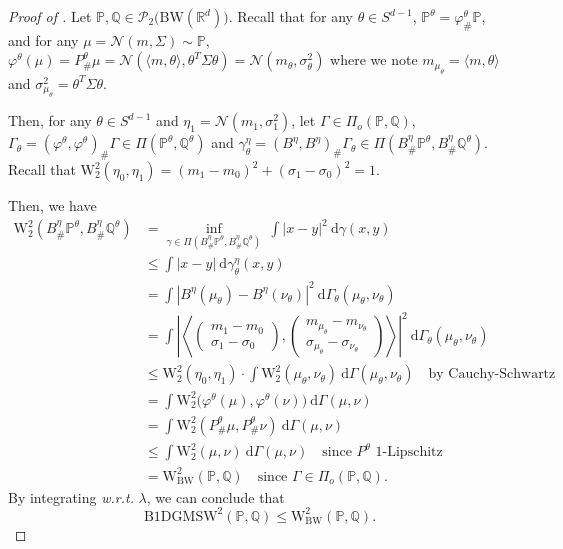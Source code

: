\documentclass[twoside]{article}
\newcommand{\cP}{\mathcal{P}}
\newcommand{\bP}{\mathbb{P}}
\newcommand{\bQ}{\mathbb{Q}}
\newcommand{\cN}{\mathcal{N}}
\newcommand{\W}{\mathrm{W}}
\newcommand{\R}{\mathbb{R}}
\newcommand{\bw}{\mathrm{BW}}
\newcommand{\smwbdg}{\mathrm{B1DGMSW}}
\begin{document}
\begin{proof}[Proof of ]
    Let $\bP, \bQ\in\cP_2\big(\bw(\R^d)\big)$. Recall that for any $\theta\in S^{d-1}$, $\bP^\theta=\varphi^\theta_\#\bP$, and for any $\mu=\cN(m,\Sigma)\sim \bP$, $\varphi^\theta(\mu)=P^\theta_\#\mu=\cN(\langle m,\theta\rangle, \theta^T\Sigma\theta) = \cN(m_\theta,\sigma_\theta^2)$ where we note $m_{\mu_\theta} = \langle m,\theta\rangle$ and $\sigma_{\mu_\theta}^2 = \theta^T\Sigma\theta$.
    
    Then, for any $\theta\in S^{d-1}$ and $\eta_1=\cN(m_1,\sigma_1^2)$, let $\Gamma\in\Pi_o(\bP,\bQ)$, $\Gamma_\theta=(\varphi^\theta, \varphi^\theta)_\#\Gamma \in \Pi(\bP^\theta,\bQ^\theta)$ and $\gamma_\theta^\eta = (B^\eta,B^\eta)_\#\Gamma_\theta\in \Pi(B^\eta_\#\bP^\theta, B^\eta_\#\bQ^\theta)$. Recall that $\W_2^2(\eta_0,\eta_1)=(m_1-m_0)^2 + (\sigma_1-\sigma_0)^2 = 1$.
    
    Then, we have
    \begin{equation}
        \begin{aligned}
            \W_2^2(B^{\eta}_\#\bP^\theta, B^\eta_\#\bQ^\theta) &= \inf_{\gamma\in\Pi(B^\eta_\#\bP^\theta, B^\eta_\#\bQ^\theta)}\ \int |x-y|^2\ \mathrm{d}\gamma(x,y) \\
            &\le \int |x-y|\ \mathrm{d}\gamma_\theta^\eta(x,y) \\
            &= \int |B^\eta(\mu_\theta) - B^\eta(\nu_\theta)|^2\ \mathrm{d}\Gamma_\theta(\mu_\theta,\nu_\theta) \\
            &= \int \left| \left\langle\begin{pmatrix} m_1-m_0 \\ \sigma_1-\sigma_0 \end{pmatrix}, \begin{pmatrix} m_{\mu_\theta} - m_{\nu_\theta} \\ \sigma_{\mu_\theta} - \sigma_{\nu_\theta} \end{pmatrix} \right\rangle \right|^2 \ \mathrm{d}\Gamma_\theta(\mu_\theta,\nu_\theta)  \\
            &\le \W_2^2(\eta_0,\eta_1) \cdot \int \W_2^2(\mu_\theta,\nu_\theta)\ \mathrm{d}\Gamma(\mu_\theta,\nu_\theta) \quad \text{by Cauchy-Schwartz} \\
            &= \int \W_2^2\big(\varphi^\theta(\mu), \varphi^\theta(\nu)\big)\ \mathrm{d}\Gamma(\mu,\nu) \\
            &= \int \W_2^2(P^\theta_\#\mu, P^\theta_\#\nu)\ \mathrm{d}\Gamma(\mu,\nu) \\ 
            &\le \int \W_2^2(\mu,\nu)\ \mathrm{d}\Gamma(\mu,\nu) \quad \text{since $P^\theta$ 1-Lipschitz} \\
            &= \W_{\bw}^2(\bP,\bQ) \quad \text{since $\Gamma\in\Pi_o(\bP,\bQ)$}.
        \end{aligned}
    \end{equation}
    By integrating \emph{w.r.t.} $\lambda$, we can conclude that
    \begin{equation}
        \smwbdg^2(\bP,\bQ) \le \W_{\bw}^2(\bP,\bQ).
    \end{equation}
\end{proof}
\end{document}
